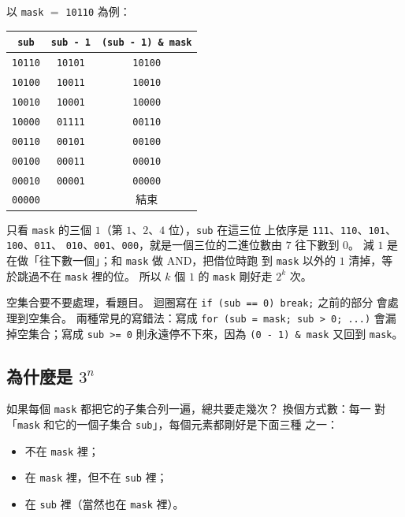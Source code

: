 以 \texttt{mask} $=$ \texttt{10110} 為例：

\begin{center}
\begin{tabular}{ccc}
\toprule
\texttt{sub} & \texttt{sub - 1} & \texttt{(sub - 1) \& mask} \\
\midrule
\texttt{10110} & \texttt{10101} & \texttt{10100} \\
\texttt{10100} & \texttt{10011} & \texttt{10010} \\
\texttt{10010} & \texttt{10001} & \texttt{10000} \\
\texttt{10000} & \texttt{01111} & \texttt{00110} \\
\texttt{00110} & \texttt{00101} & \texttt{00100} \\
\texttt{00100} & \texttt{00011} & \texttt{00010} \\
\texttt{00010} & \texttt{00001} & \texttt{00000} \\
\texttt{00000} & & 結束 \\
\bottomrule
\end{tabular}
\end{center}

只看 \texttt{mask} 的三個 $1$（第 $1$、$2$、$4$ 位），\texttt{sub} 在這三位
上依序是 \texttt{111}、\texttt{110}、\texttt{101}、\texttt{100}、\texttt{011}、
\texttt{010}、\texttt{001}、\texttt{000}，就是一個三位的二進位數由 $7$ 往下數到 $0$。 減 $1$ 是在做「往下數一個」；和 \texttt{mask} 做 AND，把借位時跑
到 \texttt{mask} 以外的 $1$ 清掉，等於跳過不在 \texttt{mask} 裡的位。 所以
$k$ 個 $1$ 的 \texttt{mask} 剛好走 $2^k$ 次。

空集合要不要處理，看題目。 迴圈寫在 \texttt{if (sub == 0) break;} 之前的部分
會處理到空集合。 兩種常見的寫錯法：寫成 \texttt{for (sub = mask; sub > 0; ...)}
會漏掉空集合；寫成 \texttt{sub >= 0} 則永遠停不下來，因為
\texttt{(0 - 1) \& mask} 又回到 \texttt{mask}。

\subsection{\texorpdfstring{為什麼是 $3^n$}{為什麼是 3ⁿ}}
\label{sec:bm-3n}

如果每個 \texttt{mask} 都把它的子集合列一遍，總共要走幾次？ 換個方式數：每一
對「\texttt{mask} 和它的一個子集合 \texttt{sub}」，每個元素都剛好是下面三種
之一：

\begin{itemize}
\item 不在 \texttt{mask} 裡；
\item 在 \texttt{mask} 裡，但不在 \texttt{sub} 裡；
\item 在 \texttt{sub} 裡（當然也在 \texttt{mask} 裡）。
\end{itemize}

